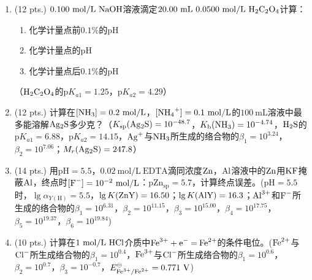 \begin{enumerate}[label=\arabic*., itemsep=1.5ex]
    \item (12 pts.) $0.100\ \mathrm{mol/L}\ \ce{NaOH}$溶液滴定$20.00\ \mathrm{mL}\ 0.0500\ \mathrm{mol/L}\ \ce{H2C2O4}$计算：
    \begin{enumerate}[label=(\arabic*), noitemsep, topsep=0pt, partopsep=0pt]
        \item 化学计量点前$0.1\%$的$\mathrm{pH}$
        \item 化学计量点的$\mathrm{pH}$
        \item 化学计量点后$0.1\%$的$\mathrm{pH}$
    \end{enumerate}
    （$\ce{H2C2O4}$的$\mathrm{p}K_{a1}=1.25$，$\mathrm{p}K_{a2}=4.29$）
    \item (12 pts.) 计算在$[\ce{NH3}]=0.2\ \mathrm{mol/L}$，$[\ce{NH4^+}]=0.1\ \mathrm{mol/L}$的$100\ \mathrm{mL}$溶液中最多能溶解$\ce{Ag2S}$多少克？（$K_{\mathrm{sp}}(\ce{Ag2S})=10^{-48.7}$，$K_\mathrm{b}(\ce{NH3})=10^{-4.74}$，$\ce{H2S}$的$\mathrm{p}K_{a1}=6.88$，$\mathrm{p}K_{a2}=14.15$，$\ce{Ag^+}$与$\ce{NH3}$所生成的络合物的$\beta_1=10^{3.24}$，$\beta_2=10^{7.06}$；$M_r(\ce{Ag2S})=247.8$）
    \item (14 pts.) 用$\mathrm{pH}=5.5$，$0.02\ \mathrm{mol/L}\ \mathrm{EDTA}$滴同浓度$\ce{Zn}$，$\ce{Al}$溶液中的$\ce{Zn}$用$\ce{KF}$掩蔽$\ce{Al}$，终点时$[\ce{F^-}]=10^{-2}\ \mathrm{mol/L}$：$\mathrm{pZn_{sp}}=5.7$，计算终点误差。($\mathrm{pH}=5.5$时，$\lg\alpha_{Y(\mathrm{H})}=5.5$，$\lg K(\ce{ZnY})=16.50$；$\lg K(\ce{AlY})=16.3$；$\ce{Al^{3+}}$和$\ce{F^-}$所生成的络合物的$\beta_1=10^{6.31}$，$\beta_2=10^{11.15}$，$\beta_3=10^{15.00}$，$\beta_4=10^{17.75}$，$\beta_5=10^{19.37}$，$\beta_6=10^{19.84}$)
    \item (10 pts.) 计算在$1\ \mathrm{mol/L}\ \ce{HCl}$介质中$\ce{Fe^{3+} + e^- = Fe^{2+}}$的条件电位。($\ce{Fe^{2+}}$与$\ce{Cl^-}$所生成络合物的$\beta_1=10^{0.4}$，$\ce{Fe^{3+}}$与$\ce{Cl^-}$所生成络合物的$\beta_1=10^{0.6}$，$\beta_2=10^{0.7}$，$\beta_3=10^{-0.7}$，$E^\ominus_{\ce{Fe^{3+}/Fe^{2+}}}=0.771\ \mathrm{V}$)
\end{enumerate}